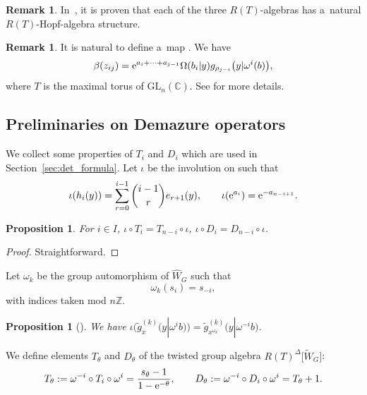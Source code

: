 \documentclass[10pt,a4paper]{amsart}
\numberwithin{equation}{section}
\newcommand{\C}{\mathbb{C}}
\newcommand{\GL}{\mathrm{GL}}
\newcommand{\reg}{\Delta}
\newcommand{\Rep}{{R(T)}}
\newcommand{\Z}{\mathbb{Z}}
\newtheorem{Proposition}[Theorem]{Proposition}
\theoremstyle{definition}
\newtheorem{Remark}[Theorem]{Remark}
\begin{document}
\begin{Remark}
In~\cite{ISY}, it is proven that
each of the three $R(T)$-algebras has a~natural $\Rep$-Hopf-algebra structure.
\end{Remark}

\begin{Remark}
It is natural to define a~map
\smash{$\beta\colon \mathscr{O}\bigl(\tilde{\mathscr{Z}}\bigr)
\rightarrow \hat{\Lambda}^\Rep$}. We have
\begin{equation}
\beta(z_{ij})= {\rm e}^{a_i+\cdots+a_{j-1}}\Omega(b_i|y)g_{\rho_{j-i}}\big(y|\omega^i(b)\big),
\label{eq:zij_in_KkSchur_GL}
\end{equation}
where $T$ is the maximal torus of $\GL_n(\C)$. See \cite[Theorem 1.2]{ISY} for more details.
\end{Remark}

\subsection{Preliminaries on Demazure operators}
We collect some properties of $T_i$ and $D_i$ which are used in Section~\ref{sec:det_formula}.
Let $\iota$ be the involution on  such that
\[
\iota(h_i(y))=\sum_{r=0}^{i-1}\binom{i-1}{r}e_{r+1}(y),\qquad
\iota({\rm e}^{a_i})={\rm e}^{-a_{n-i+1}}.
\]
\begin{Proposition}\label{prop:iota Dem}
For $i\in I$, $\iota\circ T_i=T_{n-i}\circ \iota$, $
\iota\circ D_i=D_{n-i}\circ \iota$.
\end{Proposition}
\begin{proof}
Straightforward.
\end{proof}


Let $\omega_k$ be the group automorphism of $\hat{W}_G$ such that
\begin{equation}
\label{eq:omega_k}
\omega_k(s_i)=s_{-i},
\end{equation}
with indices taken mod $n\Z$.
\begin{Proposition}[{\cite[Proposition 3.14]{ISY}}]
\label{prop:iota $K$-k}
We have
$
\iota\bigl(\tilde{g}_x^{(k)}\bigl(y|\omega^i b\bigr)\bigr)=
\tilde{g}^{(k)}_{x^{\omega_k}}\bigl(y|\omega^{-i}b\bigr)$.
\end{Proposition}

We define elements $T_{\theta}$ and $D_\theta$ of the twisted group algebra $\Rep^\reg\big[\tilde{W}_G\big]$:
\begin{equation}
\label{eq:Ttheta}
T_\theta:=\omega^{-i}\circ T_i \circ \omega^i=\frac{s_\theta-1}{1-{\rm e}^{-\theta}},\qquad
D_\theta:=\omega^{-i}\circ D_i \circ \omega^i=T_\theta+1.
\end{equation}
\end{document}
